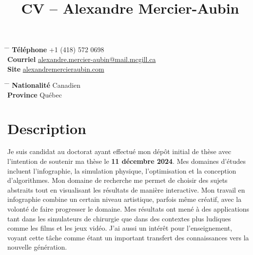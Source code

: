 \documentclass[10pt]{article} %
\begin{document}

\title{CV -- Alexandre Mercier-Aubin} %


\parbox{0.5\textwidth}{ %
\begin{tabbing} %
\hspace{3cm} \= \hspace{4cm} \= \kill %
{\bf Téléphone} \> +1 (418) 572 0698 \\ %
{\bf Courriel} \> \href{mailto:alexandre.mercier-aubin@mail.mcgill.ca}{alexandre.mercier-aubin@mail.mcgill.ca} \\ %
{\bf Site} \> \href{https://alexandremercieraubin.com}{alexandremercieraubin.com} \\
\end{tabbing}}
\hfill %
\parbox{0.5\textwidth}{ %
\begin{tabbing} %
\hspace{3cm} \= \hspace{4cm} \= \kill %
{\bf Nationalité} \> Canadien \\ %
{\bf Province} \> {Québec}\\
\end{tabbing}}

\vspace{-0.7cm} 

\justifying

\section{Description}

Je suis candidat au doctorat ayant effectué mon dépôt initial de thèse avec l'intention de soutenir ma thèse le \textbf{11 décembre 2024}. Mes domaines d'études incluent l'infographie, la simulation physique, l'optimisation et la conception d'algorithmes. Mon domaine de recherche me permet de choisir des sujets abstraits tout en visualisant les résultats de manière interactive. Mon travail en infographie combine un certain niveau artistique, parfois même créatif, avec la volonté de faire progresser le domaine. Mes résultats ont mené à des applications tant dans les simulateurs de chirurgie que dans des contextes plus ludiques comme les films et les jeux vidéo. J'ai aussi un intérêt pour l'enseignement, voyant cette tâche comme étant un important transfert des connaissances vers la nouvelle génération.
\end{document}
